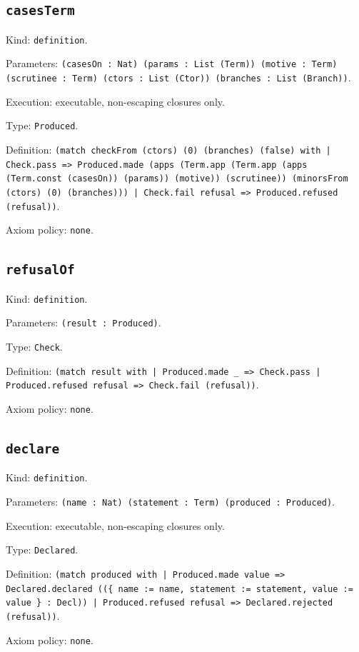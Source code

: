 \documentclass[11pt]{article}
\begin{document}
\subsection*{\texttt{casesTerm}}
\noindent Kind: \texttt{definition}.\par
\noindent Parameters: \texttt{(casesOn : Nat) (params : List (Term)) (motive : Term) (scrutinee : Term) (ctors : List (Ctor)) (branches : List (Branch))}.\par
\noindent Execution: executable, non-escaping closures only.\par
\noindent Type: \texttt{Produced}.\par
\noindent Definition: \texttt{(match checkFrom (ctors) (0) (branches) (false) with | Check.pass => Produced.made (apps (Term.app (Term.app (apps (Term.const (casesOn)) (params)) (motive)) (scrutinee)) (minorsFrom (ctors) (0) (branches))) | Check.fail refusal => Produced.refused (refusal))}.\par
\noindent Axiom policy: \texttt{none}.\par
\subsection*{\texttt{refusalOf}}
\noindent Kind: \texttt{definition}.\par
\noindent Parameters: \texttt{(result : Produced)}.\par
\noindent Type: \texttt{Check}.\par
\noindent Definition: \texttt{(match result with | Produced.made \_ => Check.pass | Produced.refused refusal => Check.fail (refusal))}.\par
\noindent Axiom policy: \texttt{none}.\par
\subsection*{\texttt{declare}}
\noindent Kind: \texttt{definition}.\par
\noindent Parameters: \texttt{(name : Nat) (statement : Term) (produced : Produced)}.\par
\noindent Execution: executable, non-escaping closures only.\par
\noindent Type: \texttt{Declared}.\par
\noindent Definition: \texttt{(match produced with | Produced.made value => Declared.declared ((\{ name := name, statement := statement, value := value \} : Decl)) | Produced.refused refusal => Declared.rejected (refusal))}.\par
\noindent Axiom policy: \texttt{none}.\par
\end{document}
